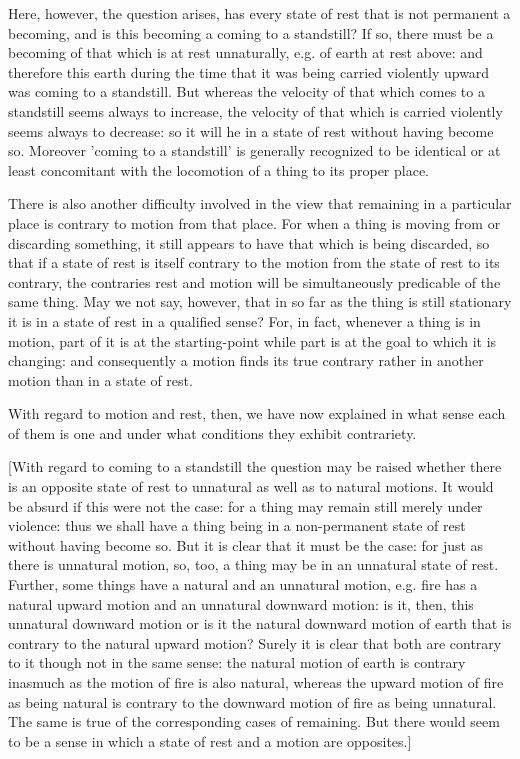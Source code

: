 Here, however, the question arises, has every state of rest that is
not permanent a becoming, and is this becoming a coming to a standstill?
If so, there must be a becoming of that which is at rest unnaturally,
e.g. of earth at rest above: and therefore this earth during the time
that it was being carried violently upward was coming to a standstill.
But whereas the velocity of that which comes to a standstill seems
always to increase, the velocity of that which is carried violently
seems always to decrease: so it will he in a state of rest without
having become so. Moreover 'coming to a standstill' is generally recognized
to be identical or at least concomitant with the locomotion of a thing
to its proper place. 

There is also another difficulty involved in the view that remaining
in a particular place is contrary to motion from that place. For when
a thing is moving from or discarding something, it still appears to
have that which is being discarded, so that if a state of rest is
itself contrary to the motion from the state of rest to its contrary,
the contraries rest and motion will be simultaneously predicable of
the same thing. May we not say, however, that in so far as the thing
is still stationary it is in a state of rest in a qualified sense?
For, in fact, whenever a thing is in motion, part of it is at the
starting-point while part is at the goal to which it is changing:
and consequently a motion finds its true contrary rather in another
motion than in a state of rest. 

With regard to motion and rest, then, we have now explained in what
sense each of them is one and under what conditions they exhibit contrariety.

[With regard to coming to a standstill the question may be raised
whether there is an opposite state of rest to unnatural as well as
to natural motions. It would be absurd if this were not the case:
for a thing may remain still merely under violence: thus we shall
have a thing being in a non-permanent state of rest without having
become so. But it is clear that it must be the case: for just as there
is unnatural motion, so, too, a thing may be in an unnatural state
of rest. Further, some things have a natural and an unnatural motion,
e.g. fire has a natural upward motion and an unnatural downward motion:
is it, then, this unnatural downward motion or is it the natural downward
motion of earth that is contrary to the natural upward motion? Surely
it is clear that both are contrary to it though not in the same sense:
the natural motion of earth is contrary inasmuch as the motion of
fire is also natural, whereas the upward motion of fire as being natural
is contrary to the downward motion of fire as being unnatural. The
same is true of the corresponding cases of remaining. But there would
seem to be a sense in which a state of rest and a motion are opposites.]

